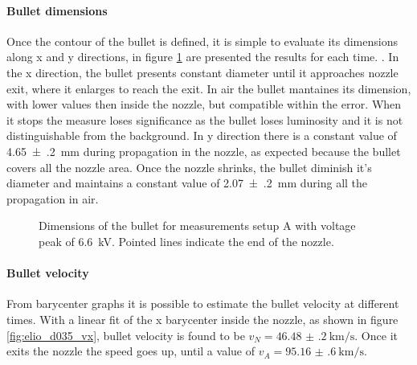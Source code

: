 \paragraph{Bullet dimensions}
Once the contour of the bullet is defined, it is simple to evaluate its dimensions along x and y directions, in figure \ref{fig:elio_d035_dim} are presented the results for each time.
.
In the x direction, the bullet presents constant diameter until it approaches nozzle exit, where it enlarges to reach the exit. In air the bullet mantaines its dimension, with lower values then inside the nozzle, but compatible within the error. When it stops the measure loses significance as the bullet loses luminosity and it is not distinguishable from the background.
In y direction there is a constant value of \SI{4.65(20)}{\milli\meter} during propagation in the nozzle, as expected because the bullet covers all the nozzle area. Once the nozzle shrinks, the bullet diminish it's diameter and maintains a constant value of \SI{2.07(20)}{\milli\meter} during all the propagation in air.
\begin{figure}
 \centering
 \hfill
 \caption{Dimensions of the bullet for measurements setup A with voltage peak of \SI{6.6}{\kilo\volt}. Pointed lines indicate the end of the nozzle.}
 \label{fig:elio_d035_dim}
\end{figure}


\paragraph{Bullet velocity}
From barycenter graphs it is possible to estimate the bullet velocity at different times.
With a linear fit of the x barycenter inside the nozzle, as shown in figure \ref{fig:elio_d035_vx}, bullet velocity is found to be $v_{N} = \SI{46.48(20)}{\kilo\meter/\second}$. Once it exits the nozzle the speed goes up, until a value of $v_{A} = \SI{95.16(60)}{\kilo\meter/\second}$.

